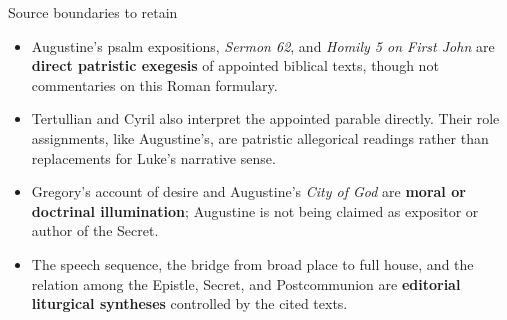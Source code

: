 \begin{deepstudy}
\begin{studybox}{Source boundaries to retain}
\begin{itemize}
\item Augustine's psalm expositions, \emph{Sermon 62}, and \emph{Homily 5 on First John} are \textbf{direct patristic exegesis} of appointed biblical texts, though not commentaries on this Roman formulary.
\item Tertullian and Cyril also interpret the appointed parable directly. Their role assignments, like Augustine's, are patristic allegorical readings rather than replacements for Luke's narrative sense.
\item Gregory's account of desire and Augustine's \emph{City of God} are \textbf{moral or doctrinal illumination}; Augustine is not being claimed as expositor or author of the Secret.
\item The speech sequence, the bridge from broad place to full house, and the relation among the Epistle, Secret, and Postcommunion are \textbf{editorial liturgical syntheses} controlled by the cited texts.
\end{itemize}
\end{studybox}

\sectionguard

\end{deepstudy}
